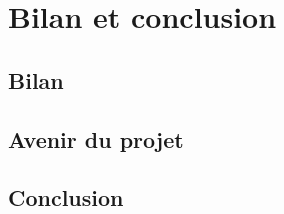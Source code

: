 \documentclass[french]{report}
\begin{document}
\chapter{Bilan et conclusion}
\section{Bilan}
\label{partie_bilan}

\section{Avenir du projet}
\label{partie_avenir}

\section{Conclusion}
\label{partie_conclusion}



\appendix 

\end{document}
